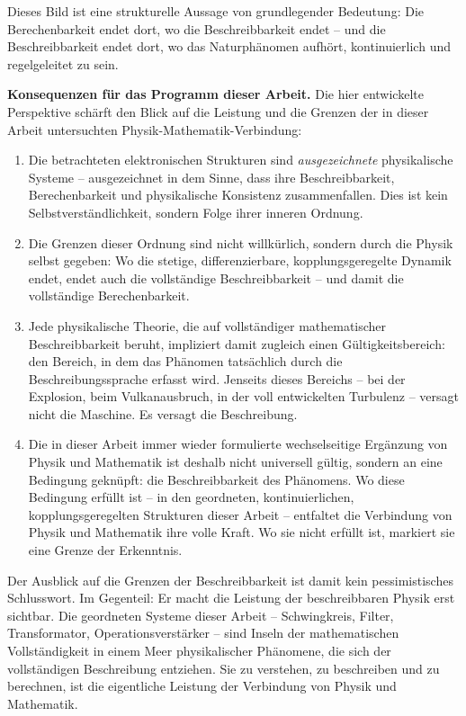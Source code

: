 ﻿\documentclass[12pt, a4paper]{article}
\begin{document}
	Dieses Bild ist eine strukturelle Aussage von grundlegender Bedeutung: Die Berechenbarkeit endet dort, wo die Beschreibbarkeit endet -- und die Beschreibbarkeit endet dort, wo das Naturphänomen aufhört, kontinuierlich und regelgeleitet zu sein.

	\textbf{Konsequenzen für das Programm dieser Arbeit.}
	Die hier entwickelte Perspektive schärft den Blick auf die Leistung und die Grenzen der in dieser Arbeit untersuchten Physik-Mathematik-Verbindung:

	\begin{enumerate}
		\item Die betrachteten elektronischen Strukturen sind \textit{ausgezeichnete} physikalische Systeme -- ausgezeichnet in dem Sinne, dass ihre Beschreibbarkeit, Berechenbarkeit und physikalische Konsistenz zusammenfallen. Dies ist kein Selbstverständlichkeit, sondern Folge ihrer inneren Ordnung.
		\item Die Grenzen dieser Ordnung sind nicht willkürlich, sondern durch die Physik selbst gegeben: Wo die stetige, differenzierbare, kopplungsgeregelte Dynamik endet, endet auch die vollständige Beschreibbarkeit -- und damit die vollständige Berechenbarkeit.
		\item Jede physikalische Theorie, die auf vollständiger mathematischer Beschreibbarkeit beruht, impliziert damit zugleich einen Gültigkeitsbereich: den Bereich, in dem das Phänomen tatsächlich durch die Beschreibungssprache erfasst wird. Jenseits dieses Bereichs -- bei der Explosion, beim Vulkanausbruch, in der voll entwickelten Turbulenz -- versagt nicht die Maschine. Es versagt die Beschreibung.
		\item Die in dieser Arbeit immer wieder formulierte wechselseitige Ergänzung von Physik und Mathematik ist deshalb nicht universell gültig, sondern an eine Bedingung geknüpft: die Beschreibbarkeit des Phänomens. Wo diese Bedingung erfüllt ist -- in den geordneten, kontinuierlichen, kopplungsgeregelten Strukturen dieser Arbeit -- entfaltet die Verbindung von Physik und Mathematik ihre volle Kraft. Wo sie nicht erfüllt ist, markiert sie eine Grenze der Erkenntnis.
	\end{enumerate}

	Der Ausblick auf die Grenzen der Beschreibbarkeit ist damit kein pessimistisches Schlusswort. Im Gegenteil: Er macht die Leistung der beschreibbaren Physik erst sichtbar. Die geordneten Systeme dieser Arbeit -- Schwingkreis, Filter, Transformator, Operationsverstärker -- sind Inseln der mathematischen Vollständigkeit in einem Meer physikalischer Phänomene, die sich der vollständigen Beschreibung entziehen. Sie zu verstehen, zu beschreiben und zu berechnen, ist die eigentliche Leistung der Verbindung von Physik und Mathematik.
\end{document}
